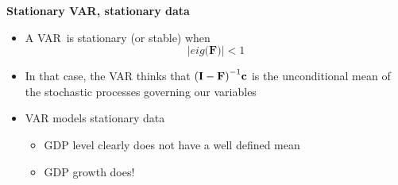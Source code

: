 \documentclass[10pt,handout]{beamer}
\begin{document}
\vspace{0.1cm}

\begin{frame}
{\textbf{Stationary VAR, stationary data}}

\begin{itemize}
\item A VAR\ is stationary (or stable) when 
\begin{equation*}
\left\vert eig(\mathbf{F)}\right\vert <1
\end{equation*}

\item In that case, the VAR thinks that $\mathbf{(I-\mathbf{F})}^{-1}\mathbf{%
c}$ is the {{\color{red} unconditional mean}} of the stochastic processes
governing our variables\medskip 

\item VAR models stationary data

\begin{itemize}
\item GDP level clearly does not have a well defined mean

\item GDP growth does!
\end{itemize}
\end{itemize}
\end{frame}

\vspace{.1cm}
\end{document}
